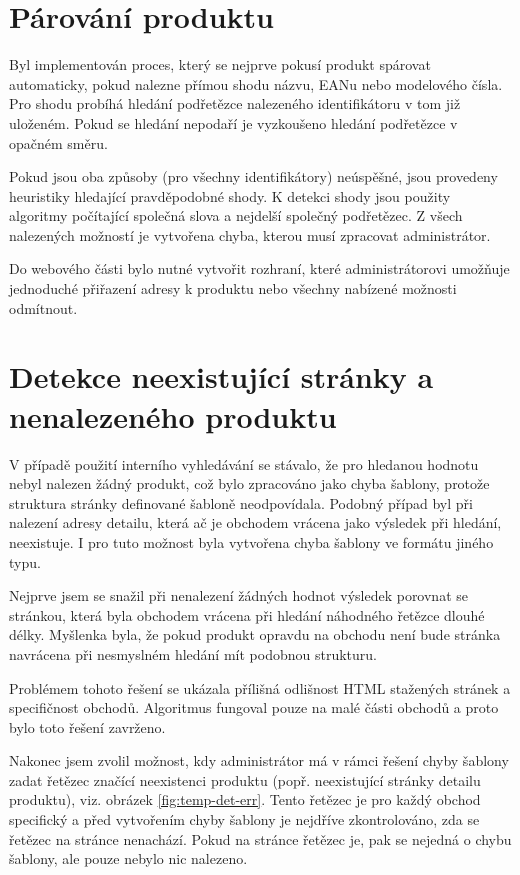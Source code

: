 \documentclass[thesis=B,czech]{FITthesis}[2012/06/26]
\begin{document}
\section{Párování produktu}
Byl implementován proces, který se nejprve pokusí produkt spárovat automaticky, pokud nalezne přímou shodu názvu, EANu nebo modelového čísla.
Pro shodu probíhá hledání podřetězce nalezeného identifikátoru v tom již uloženém. Pokud se hledání nepodaří je vyzkoušeno hledání
podřetězce v opačném směru.
\par
Pokud jsou oba způsoby (pro všechny identifikátory) neúspěšné, jsou provedeny heuristiky hledající pravděpodobné shody. K detekci shody jsou použity algoritmy počítající společná slova a nejdelší společný podřetězec. Z všech nalezených možností je vytvořena chyba, kterou musí zpracovat administrátor.
\par 
Do webového části bylo nutné vytvořit rozhraní, které administrátorovi umožňuje jednoduché přiřazení 
adresy k produktu nebo všechny nabízené možnosti odmítnout.


\section{Detekce neexistující stránky a nenalezeného produktu}
V případě použití interního vyhledávání se stávalo, že pro hledanou hodnotu nebyl nalezen žádný produkt, což bylo zpracováno
jako chyba šablony, protože struktura stránky definované šabloně neodpovídala. Podobný případ byl při nalezení adresy detailu, která
ač je obchodem vrácena jako výsledek při hledání, neexistuje. I pro tuto možnost byla vytvořena chyba šablony ve formátu jiného typu.
\par
Nejprve jsem se snažil při nenalezení žádných hodnot výsledek porovnat se stránkou, která byla obchodem vrácena při hledání náhodného
řetězce dlouhé délky. Myšlenka byla, že pokud produkt opravdu na obchodu není bude stránka navrácena při nesmyslném hledání mít podobnou strukturu.
\par
Problémem tohoto řešení se ukázala přílišná odlišnost HTML stažených stránek a specifičnost obchodů. Algoritmus fungoval
pouze na malé části obchodů a proto bylo toto řešení zavrženo.
\par
Nakonec jsem zvolil možnost, kdy administrátor má v rámci řešení chyby šablony zadat řetězec značící neexistenci produktu (popř. neexistující stránky detailu produktu), viz. obrázek \ref{fig:temp-det-err}. Tento řetězec je pro každý obchod specifický a před vytvořením chyby šablony je nejdříve zkontrolováno, zda se řetězec na stránce nenachází. Pokud na stránce řetězec je, pak se nejedná o chybu šablony, ale pouze nebylo nic nalezeno.
\end{document}
